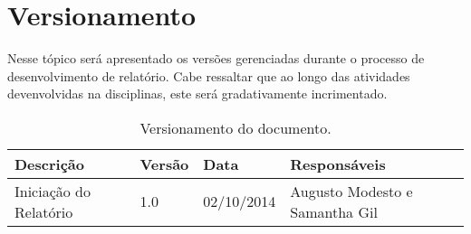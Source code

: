 \chapter[Versionamento]{Versionamento}
\label{chap:versionamento}
	Nesse tópico será apresentado os versões gerenciadas durante o processo de desenvolvimento de relatório. Cabe ressaltar que ao longo das atividades devenvolvidas na disciplinas, este será gradativamente incrimentado.
	
	\label{subsubsec:versionamento_talbe}
		\begin{table}[h]
			\centering
			\begin{tabular}{|p{5cm}|p{1.5cm}|p{2.5cm}|p{5cm}|}
				\hline
				Descrição & Versão & Data & Responsáveis \\ \hline
				Iniciação do Relatório & 1.0 & 02/10/2014 & Augusto Modesto e Samantha Gil \\ \hline
			\end{tabular}
			\caption[Versionamento do Documento]{Versionamento do documento.}
			\label{tab:versionamento_tabl}
		\end{table}
